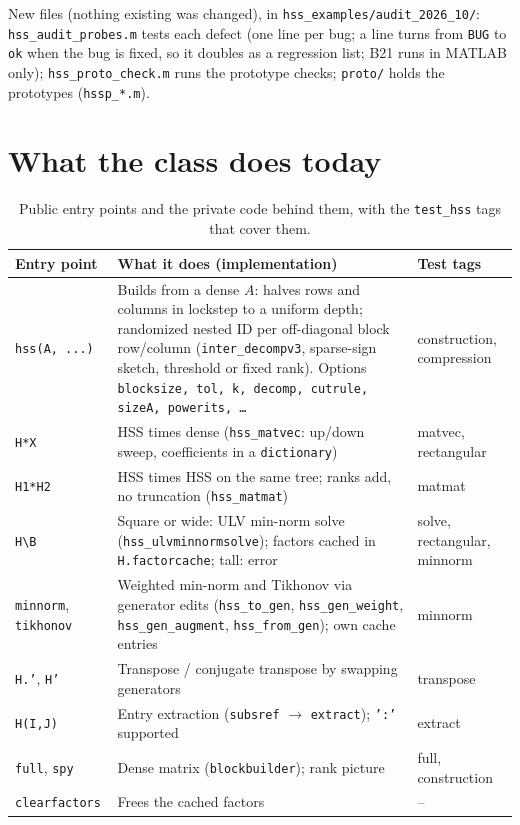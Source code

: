 \documentclass[11pt]{article}
\newcommand{\code}[1]{\texttt{#1}}
\begin{document}
\noindent New files (nothing existing was changed), in \code{hss\_examples/audit\_2026\_10/}:
\code{hss\_audit\_probes.m} tests each defect (one line per bug; a line turns from \code{BUG} to \code{ok}
when the bug is fixed, so it doubles as a regression list; B21 runs in MATLAB only); \code{hss\_proto\_check.m} runs the prototype checks;
\code{proto/} holds the prototypes (\code{hssp\_*.m}).

\section{What the class does today}\label{sec:inventory}
\begin{table}[h]
\centering\small
\caption{Public entry points and the private code behind them, with the \code{test\_hss} tags that cover them.}
\label{tab:inventory}
\begin{tabularx}{\linewidth}{@{}L{2.9cm}YL{2.2cm}@{}}
\toprule
Entry point & What it does (implementation) & Test tags\\
\midrule
\code{hss(A, ...)} & Builds from a dense $A$: halves rows and columns in lockstep to a uniform depth; randomized
nested ID per off-diagonal block row/column (\code{inter\_decompv3}, sparse-sign sketch, threshold or fixed rank).
Options \code{blocksize, tol, k, decomp, cutrule, sizeA, powerits, \dots} & construction, compression\\
\code{H*X} & HSS times dense (\code{hss\_matvec}: up/down sweep, coefficients in a \code{dictionary}) & matvec, rectangular\\
\code{H1*H2} & HSS times HSS on the same tree; ranks add, no truncation (\code{hss\_matmat}) & matmat\\
\code{H\textbackslash B} & Square or wide: ULV min-norm solve (\code{hss\_ulvminnormsolve}); factors cached in
\code{H.factorcache}; tall: error & solve, rectangular, minnorm\\
\code{minnorm}, \code{tikhonov} & Weighted min-norm and Tikhonov via generator edits (\code{hss\_to\_gen},
\code{hss\_gen\_weight}, \code{hss\_gen\_augment}, \code{hss\_from\_gen}); own cache entries & minnorm\\
\code{H.'}, \code{H'} & Transpose / conjugate transpose by swapping generators & transpose\\
\code{H(I,J)} & Entry extraction (\code{subsref} $\to$ \code{extract}); \code{':'} supported & extract\\
\code{full}, \code{spy} & Dense matrix (\code{blockbuilder}); rank picture & full, construction\\
\code{clearfactors} & Frees the cached factors & --\\
\bottomrule
\end{tabularx}
\end{table}
\end{document}

